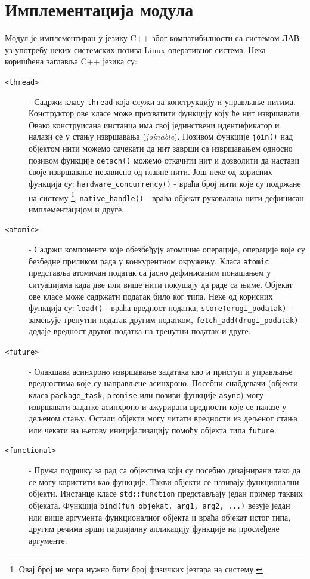 \documentclass[12pt,oneside]{memoir}
\begin{document}
\section{Имплементација модула}
Модул је имплементиран у језику C++ због компатибилности са системом ЛАВ уз употребу неких системских позива Linux оперативног система. Нека коришћена заглавља C++ језика су: \cite{cpp}

\begin{description}
	\item[\texttt{<thread>}] - Садржи класу \texttt{thread} која служи за конструкцију и управљање нитима. Конструктор ове класе може прихватити функцију коју ће нит извршавати. Овако конструисана инстанца има свој јединствени идентификатор и налази се у стању извршавања (\textit{joinable}). Позивом функције \texttt{join()} над објектом нити можемо сачекати да нит заврши са извршавањем односно позивом функције \texttt{detach()} можемо откачити нит и дозволити да настави своје извршавање независно од главне нити. Још неке од корисних функција су: \texttt{hardware\_concurrency()} - враћа број нити које су подржане на систему \footnote{Овај број не мора нужно бити број физичких језгара на систему.}, \texttt{native\_handle()} - враћа објекат руковалаца нити дефинисан имплементацијом и друге.
	\item[\texttt{<atomic>}] - Садржи компоненте које обезбеђују атомичне операције, операције које су безбедне приликом рада у конкурентном окружењу. Класа \texttt{atomic} представља атомичан податак са јасно дефинисаним понашањем у ситуацијама када две или више нити покушају да раде са њиме. Објекат ове класе може садржати податак било ког типа. Неке од корисних функција су: \texttt{load()} - враћа вредност податка, \texttt{store(drugi\_podatak)} - замењује тренутни податак другим податком, \texttt{fetch\_add(drugi\_podatak)} - додаје вредност другог податка на тренутни податак и друге.
	\item[\texttt{<future>}] - Олакшава асинхронo извршавање задатака као и приступ и управљање вредностима које су направљене асинхроно. Посебни снабдевачи (објекти класа \texttt{package\_task}, \texttt{promise} или позиви функције \texttt{async}) могу извршавати задатке асинхроно и ажурирати вредности које се налазе у дељеном стању. Остали објекти могу читати вредности из дељеног стања или чекати на његову иницијализацију помоћу објекта типа \texttt{future}.    
	\item[\texttt{<functional>}] - Пружа подршку за рад са објектима који су посебно дизајнирани тако да се могу користити као функције. Такви објекти се називају функционални објекти. Инстанце класе \texttt{std::function} представљају један пример таквих објеката. Функција \texttt{bind(fun\_objekat, arg1, arg2, ...)}  везује један или више аргумента функционалног објекта и враћа објекат истог типа, другим речима врши парцијалну апликацију функције на прослеђене аргументе.   
\end{description}
\end{document}

